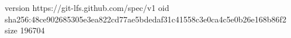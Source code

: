 version https://git-lfs.github.com/spec/v1
oid sha256:48ce902685305e3ea822cd77ae5bdedaf31c41558c3e0ca4c5e0b26e168b86f2
size 196704
